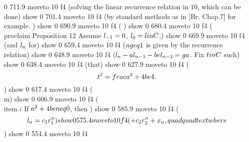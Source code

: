 0 711.9 moveto
10 f4
(solving the linear recurrence relation in \(10\), which can be done) show
0 701.4 moveto
10 f4
(by standard methods as in [Br, Chap.7] for example.  ) show
0 690.9 moveto
10 f4
( ) show
0 680.4 moveto
10 f4
(\\proclaim { Proposition 12} Assume  $\\l_{-1} = 0$, $\\l_0 = \\l\\in \\C$,) show
0 669.9 moveto
10 f4
(and $\\l_{n}$ for) show
0 659.4 moveto
10 f4
($n \\geq 1$ is given by the recurrence relation) show
0 648.9 moveto
10 f4
($\\l_{n}-\\a\\l_{n-1} -\\be \\l_{n-2} = \\ga$.  Fix $t \\in \\C$ such) show
0 638.4 moveto
10 f4
(that) show
0 627.9 moveto
10 f4
($$t^2 = \\frac {\\a^2 + 4\\be}{4}.$$) show
0 617.4 moveto
10 f4
(\\m) show
0 606.9 moveto
10 f4
(\\item {}{\(i\)} If $\\a^2 + 4 \\be\\neq 0$, then ) show
0 585.9 moveto
10 f4
($$\\l_n = c_1 r_1^n) show
0 575.4 moveto
10 f4
(+ c_2 r_2^n  + x_n, \\quad \\quad \\text{where}$$ ) show
0 554.4 moveto
10 f4
